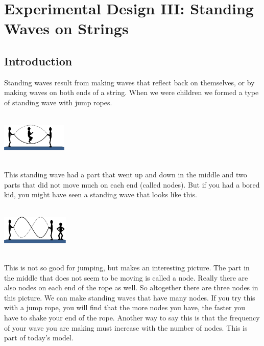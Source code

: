 \documentclass{book}
\begin{document}
\chapter[Experimental Design III]{Experimental Design III: Standing Waves on Strings}

\section{Introduction}

Standing waves result from making waves that reflect back on themselves, or by
making waves on both ends of a string. When we were children we formed a type
of standing wave with jump ropes.
\begin{center}
\includegraphics[natheight=3.749800in,natwidth=5.000400in,height=0.9262in,width=1.2306in]{Lab6_figs/JumpRope1stHar.eps}
\end{center}
This standing wave had a part that went up and down in the middle and two
parts that did not move much on each end (called nodes). But if you had a
bored kid, you might have seen a standing wave that looks like this.%
\begin{center}
\includegraphics[natheight=3.749800in,natwidth=5.000400in,height=0.9446in,width=1.256in]{Lab6_figs/JumpRope2ndHar.eps}
\end{center}
This is not so good for jumping, but makes an interesting picture. The part in
the middle that does not seem to be moving is called a node. Really there are
also nodes on each end of the rope as well. So altogether there are three
nodes in this picture. We can make standing waves that have many nodes. If you
try this with a jump rope, you will find that the more nodes you have, the
faster you have to shake your end of the rope. Another way to say this is that
the frequency of your wave you are making must increase with the number of
nodes. This is part of today's model.
\end{document}
